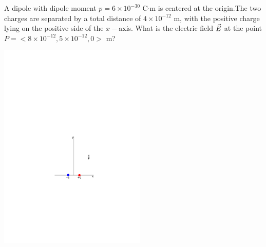 \newcommand{\moment}{$6\times10^{-30}$ C$\cdot$m}
\newcommand{\dist}{$4\times10^{-12}$ m}
\question A dipole with dipole moment $p=$\moment{} is centered at the origin.The two charges are separated by a total distance of \dist, with the positive charge lying on the positive side of the $x-$axis. What is the electric field $\vec{E}$ at the point $P= <8\times 10^{-12}, 5\times 10^{-12},0>$ m?

\begin{center}
	\includegraphics[width=7cm]{prob4.pdf}
\end{center}